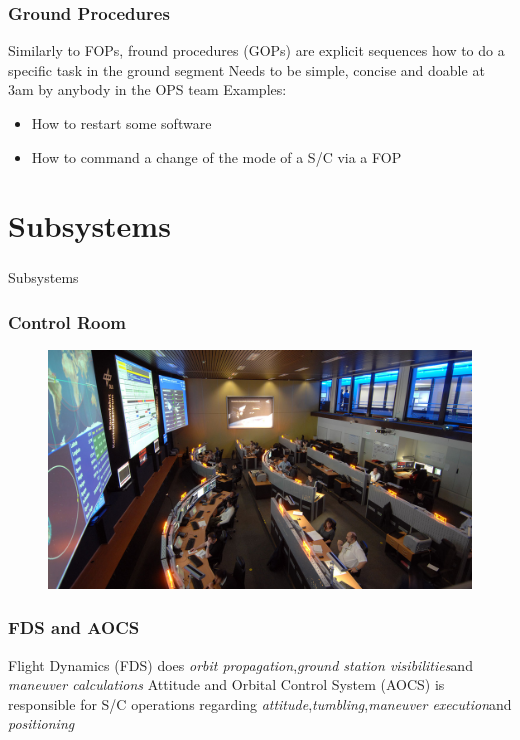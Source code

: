 \documentclass[12pt,utf8,notheorems,compress]{beamer}
\begin{document}
\begin{frame}
  \frametitle{Ground Procedures}
  \pause
  Similarly to FOPs, fround procedures (GOPs) are explicit sequences how to do a specific task in the ground segment \pause
  \vfill
  Needs to be simple, concise and doable at 3am by anybody in the OPS team
  \vfill
  Examples: \pause
  \begin{itemize}
  \item How to restart some software \pause
  \item How to command a change of the mode of a S/C via a FOP
  \end{itemize}
\end{frame}

\section{Subsystems}

\begin{frame}
  \frametitle{}
  \vfill
  \begin{center}
    \Large Subsystems
  \end{center}
  \vfill
\end{frame}

\begin{frame}
  \frametitle{Control Room}
  \pause
  \begin{figure}[!ht]
    \centering
    \includegraphics[width=\textwidth]{k1.jpg}
  \end{figure}
\end{frame}

\begin{frame}
  \frametitle{FDS and AOCS}
  \pause
  Flight Dynamics (FDS) does \emph{orbit propagation},\pause \emph{ground station visibilities}\pause and \emph{maneuver calculations}
  \vfill
  Attitude and Orbital Control System (AOCS) is responsible for S/C operations regarding \emph{attitude},\pause \emph{tumbling},\pause \emph{maneuver execution}\pause and \emph{positioning}
\end{frame}
\end{document}
